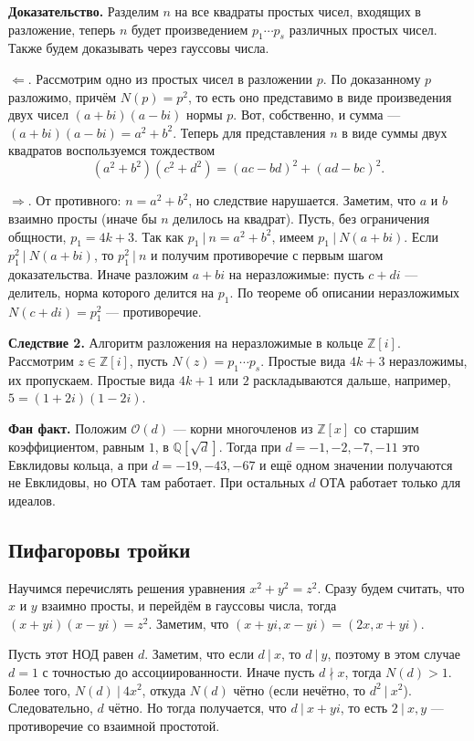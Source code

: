 \textbf{Доказательство.} 
Разделим $n$ на все квадраты простых чисел, входящих в разложение, теперь $n$ будет произведением $p_1 \cdots p_s$ различных простых чисел.
Также будем доказывать через гауссовы числа.

$\Leftarrow$. Рассмотрим одно из простых чисел в разложении $p$.
По доказанному $p$ разложимо, причём $N(p) = p^2$, то есть оно представимо в виде произведения двух чисел $(a + bi)(a - bi)$ нормы $p$.
Вот, собственно, и сумма --- $(a + bi)(a - bi) = a^2 + b^2$.
Теперь для представления $n$ в виде суммы двух квадратов воспользуемся тождеством
\[
    (a^2 + b^2)(c^2 + d^2) = (ac - bd)^2 + (ad - bc)^2.
\]

$\Rightarrow$. От противного: $n = a^2 + b^2$, но следствие нарушается.
Заметим, что $a$ и $b$ взаимно просты (иначе бы $n$ делилось на квадрат).
Пусть, без ограничения общности, $p_1 = 4k + 3$.
Так как $p_1~|~n = a^2 + b^2$, имеем $p_1~|~N(a + bi)$.
Если $p_1^2~|~N(a + bi)$, то $p_1^2~|~n$ и получим противоречие с первым шагом доказательства.
Иначе разложим $a + bi$ на неразложимые: пусть $c + di$ --- делитель, норма которого делится на $p_1$.
По теореме об описании неразложимых $N(c + di) = p_1^2$ --- противоречие.

\QED

\textbf{Следствие 2.} Алгоритм разложения на неразложимые в кольце $\mathbb Z[i]$.
Рассмотрим $z \in \mathbb Z[i]$, пусть $N(z) = p_1 \cdots p_s$.
Простые вида $4k + 3$ неразложимы, их пропускаем.
Простые вида $4k + 1$ или $2$ раскладываются дальше, например, $5 = (1 + 2i)(1 - 2i)$.

\textbf{Фан факт.} Положим $\mathcal O(d)$ --- корни многочленов из $\mathbb Z[x]$ со старшим коэффициентом, равным $1$, в $\mathbb Q[\sqrt d]$.
Тогда при $d = -1, -2, -7, -11$ это Евклидовы кольца, а при $d = -19, -43, -67$ и ещё одном значении получаются не Евклидовы, но ОТА там работает.
При остальных $d$ ОТА работает только для идеалов.

\subsection{Пифагоровы тройки}
Научимся перечислять решения уравнения $x^2 + y^2 = z^2$.
Сразу будем считать, что $x$ и $y$ взаимно просты, и перейдём в гауссовы числа, тогда $(x + yi)(x - yi) = z^2$.
Заметим, что $(x + yi, x - yi) = (2x, x + yi)$.

Пусть этот НОД равен $d$.
Заметим, что если $d~|~x$, то $d~|~y$, поэтому в этом случае $d = 1$ с точностью до ассоциированности.
Иначе пусть $d \nmid x$, тогда $N(d) > 1$.
Более того, $N(d)~|~4x^2$, откуда $N(d)$ чётно (если нечётно, то $d^2~|~x^2$).
Следовательно, $d$ чётно.
Но тогда получается, что $d~|~x + yi$, то есть $2~|~x, y$ --- противоречие со взаимной простотой.

